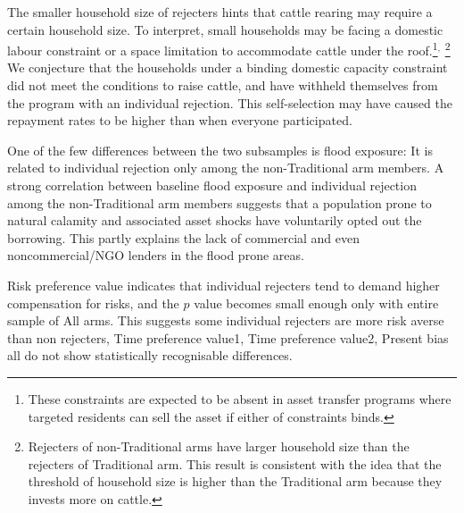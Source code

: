 
	The smaller household size of rejecters hints that cattle rearing may require a certain household size. To interpret, small households may be facing a domestic labour constraint or a space limitation to accommodate cattle under the roof.\footnote{These constraints are expected to be absent in asset transfer programs where targeted residents can sell the asset if either of constraints binds. }$^{,}$ \footnote{Rejecters of non-\textsf{Traditional} arms have larger household size than the rejecters of \textsf{Traditional} arm. This result is consistent with the idea that the threshold of household size is higher than the \textsf{Traditional} arm because they invests more on cattle. } We conjecture that the households under a binding domestic capacity constraint did not meet the conditions to raise cattle, and have withheld themselves from the program with an individual rejection. This self-selection may have caused the repayment rates to be higher than when everyone participated. 

	One of the few differences between the two subsamples is flood exposure: It is related to individual rejection only among the non-\textsf{Traditional} arm members. %
	A strong correlation between baseline flood exposure and individual rejection among the non-\textsf{Traditional} arm members suggests that a population prone to natural calamity and associated asset shocks have voluntarily opted out the borrowing. This partly explains the lack of commercial and even noncommercial/NGO lenders in the flood prone areas. 
	
	\textsf{Risk preference value} indicates that individual rejecters tend to demand higher compensation for risks, and the $p$ value becomes small enough only with entire sample of \textsf{All arms}. This suggests some individual rejecters are more risk averse than non rejecters,  \textsf{Time preference value1, Time preference value2, Present bias} all do not show statistically recognisable differences. 

